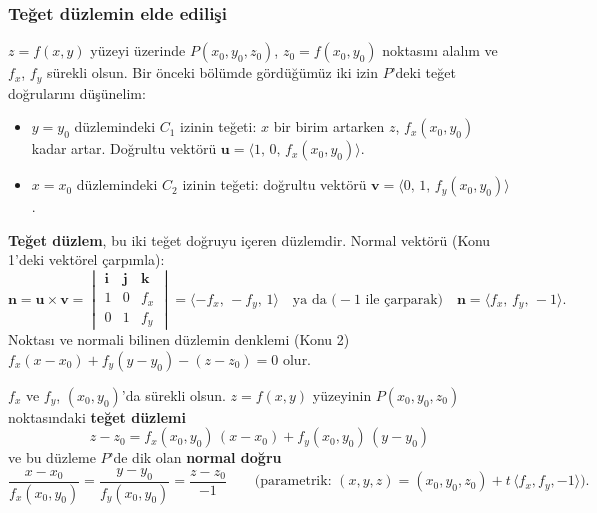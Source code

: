 \subsubsection{Teğet düzlemin elde edilişi}

$z=f(x,y)$ yüzeyi üzerinde $P(x_0,y_0,z_0)$, $z_0=f(x_0,y_0)$ noktasını alalım ve $f_x$, $f_y$ sürekli olsun.
Bir önceki bölümde gördüğümüz iki izin $P$'deki teğet doğrularını düşünelim:
\begin{itemize}
  \item $y=y_0$ düzlemindeki $C_1$ izinin teğeti: $x$ bir birim artarken $z$, $f_x(x_0,y_0)$ kadar artar. Doğrultu
        vektörü $\mathbf u=\langle1,\,0,\,f_x(x_0,y_0)\rangle$.
  \item $x=x_0$ düzlemindeki $C_2$ izinin teğeti: doğrultu vektörü $\mathbf v=\langle0,\,1,\,f_y(x_0,y_0)\rangle$.
\end{itemize}
\textbf{Teğet düzlem}, bu iki teğet doğruyu içeren düzlemdir. Normal vektörü (Konu 1'deki vektörel çarpımla):
\[
\mathbf n=\mathbf u\times\mathbf v=
\begin{vmatrix}\mathbf i&\mathbf j&\mathbf k\\ 1&0&f_x\\ 0&1&f_y\end{vmatrix}
=\langle -f_x,\,-f_y,\,1\rangle
\quad\text{ya da (}-1\text{ ile çarparak)}\quad \mathbf n=\langle f_x,\,f_y,\,-1\rangle .
\]
Noktası ve normali bilinen düzlemin denklemi (Konu 2) $f_x(x-x_0)+f_y(y-y_0)-(z-z_0)=0$ olur.

\begin{teorem}
$f_x$ ve $f_y$, $(x_0,y_0)$'da sürekli olsun. $z=f(x,y)$ yüzeyinin $P(x_0,y_0,z_0)$ noktasındaki \textbf{teğet düzlemi}
\[
\boxed{\,z-z_0=f_x(x_0,y_0)\,(x-x_0)+f_y(x_0,y_0)\,(y-y_0)\,}
\]
ve bu düzleme $P$'de dik olan \textbf{normal doğru}
\[
\frac{x-x_0}{f_x(x_0,y_0)}=\frac{y-y_0}{f_y(x_0,y_0)}=\frac{z-z_0}{-1}
\qquad\big(\text{parametrik: }(x,y,z)=(x_0,y_0,z_0)+t\,\langle f_x,f_y,-1\rangle\big).
\]
\end{teorem}

